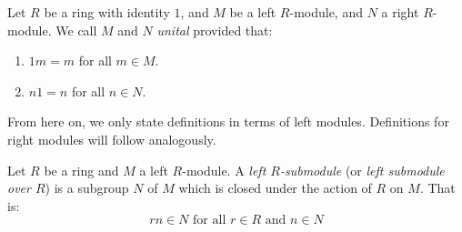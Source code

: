 \begin{definition}
  Let $R$ be a ring with identity $1$, and $M$ be a left
  $R$-module, and $N$ a right $R$-module. We call $M$ and $N$
   \textit{unital} provided that:
   \begin{enumerate}
     \item[(1)] $1m=m$ for all $m \in M$.

     \item[(2)] $n1=n$ for all $n \in N$.
   \end{enumerate}
\end{definition}

\begin{remark}
  From here on, we only state definitions in terms of left modules.
  Definitions for right modules will follow analogously.
\end{remark}

\begin{definition}
  Let $R$ be a ring and $M$ a left $R$-module. A \textit{left
  $R$-submodule} (or \textit{left submodule over $R$}) is a subgroup
  $N$ of $M$ which is closed under the action of $R$ on $M$. That
  is:
  \begin{equation*}
    rn \in N \text{ for all } r \in R \text{ and } n \in N
  \end{equation*}
\end{definition}

